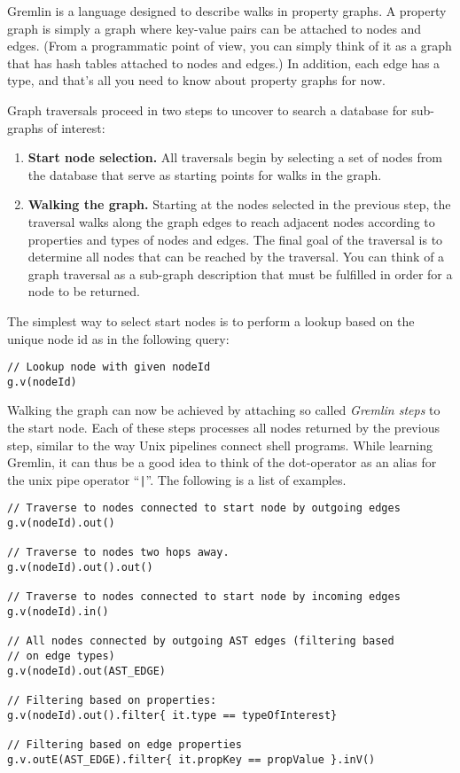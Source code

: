 \documentclass[a4paper]{article}
\newcommand{\code}[1]{\texttt{\small #1}}
\begin{document}
Gremlin is a language designed to describe walks in property graphs. A
property graph is simply a graph where key-value pairs can be attached
to nodes and edges. (From a programmatic point of view, you can simply
think of it as a graph that has hash tables attached to nodes and
edges.)  In addition, each edge has a type, and that's all you need to
know about property graphs for now.


Graph traversals proceed in two steps to uncover to search a database
for sub-graphs of interest:

\begin{enumerate}
  
\item \textbf{Start node selection.} All traversals begin by
  selecting a set of nodes from the database that serve as starting
  points for walks in the graph.
  
\item \textbf{Walking the graph.} Starting at the nodes selected in
  the previous step, the traversal walks along the graph edges to
  reach adjacent nodes according to properties and types of nodes and
  edges. The final goal of the traversal is to determine all nodes
  that can be reached by the traversal. You can think of a graph
  traversal as a sub-graph description that must be fulfilled in order
  for a node to be returned.
  
\end{enumerate}

The simplest way to select start nodes is to perform a lookup based on
the unique node id as in the following query:
\begin{verbatim}
// Lookup node with given nodeId
g.v(nodeId)
\end{verbatim}

Walking the graph can now be achieved by attaching so called
\emph{Gremlin steps} to the start node. Each of these steps processes
all nodes returned by the previous step, similar to the way Unix
pipelines connect shell programs. While learning Gremlin, it can thus
be a good idea to think of the dot-operator as an alias for the unix
pipe operator ``\code{|}''. The following is a list of examples.

\begin{verbatim}
// Traverse to nodes connected to start node by outgoing edges
g.v(nodeId).out()

// Traverse to nodes two hops away.
g.v(nodeId).out().out()

// Traverse to nodes connected to start node by incoming edges
g.v(nodeId).in()

// All nodes connected by outgoing AST edges (filtering based
// on edge types)
g.v(nodeId).out(AST_EDGE)

// Filtering based on properties:
g.v(nodeId).out().filter{ it.type == typeOfInterest}

// Filtering based on edge properties
g.v.outE(AST_EDGE).filter{ it.propKey == propValue }.inV()
\end{verbatim}
\end{document}
